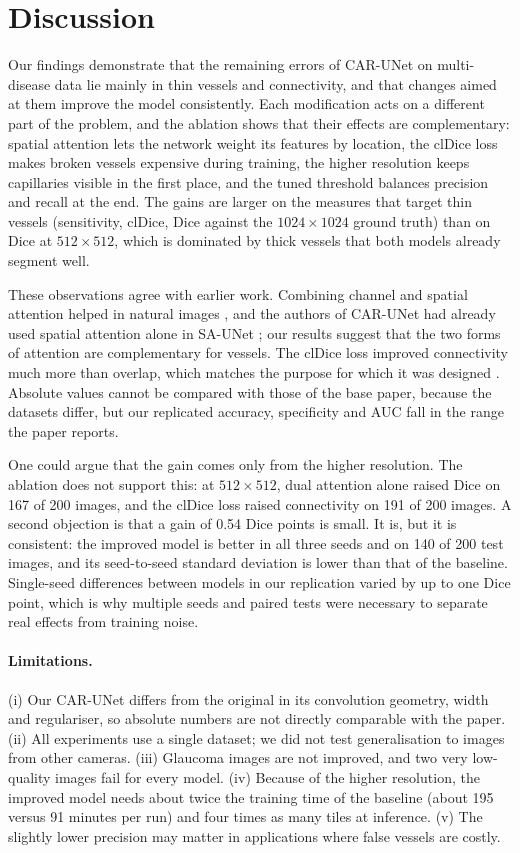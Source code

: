 \documentclass[a4paper,fleqn]{cas-sc}
\begin{document}
\section{Discussion}
\label{sec:discussion}

Our findings demonstrate that the remaining errors of CAR-UNet on multi-disease data lie mainly in thin vessels and connectivity, and that changes aimed at them improve the model consistently. Each modification acts on a different part of the problem, and the ablation shows that their effects are complementary: spatial attention lets the network weight its features by location, the clDice loss makes broken vessels expensive during training, the higher resolution keeps capillaries visible in the first place, and the tuned threshold balances precision and recall at the end. The gains are larger on the measures that target thin vessels (sensitivity, clDice, Dice against the $1024\times1024$ ground truth) than on Dice at $512\times512$, which is dominated by thick vessels that both models already segment well.

These observations agree with earlier work. Combining channel and spatial attention helped in natural images \citep{woo2018cbam}, and the authors of CAR-UNet had already used spatial attention alone in SA-UNet \citep{guo2021saunet}; our results suggest that the two forms of attention are complementary for vessels. The clDice loss improved connectivity much more than overlap, which matches the purpose for which it was designed \citep{shit2021cldice}. Absolute values cannot be compared with those of the base paper, because the datasets differ, but our replicated accuracy, specificity and AUC fall in the range the paper reports.

One could argue that the gain comes only from the higher resolution. The ablation does not support this: at $512\times512$, dual attention alone raised Dice on 167 of 200 images, and the clDice loss raised connectivity on 191 of 200 images. A second objection is that a gain of 0.54 Dice points is small. It is, but it is consistent: the improved model is better in all three seeds and on 140 of 200 test images, and its seed-to-seed standard deviation is lower than that of the baseline. Single-seed differences between models in our replication varied by up to one Dice point, which is why multiple seeds and paired tests were necessary to separate real effects from training noise.

\paragraph{Limitations.} (i) Our CAR-UNet differs from the original in its convolution geometry, width and regulariser, so absolute numbers are not directly comparable with the paper. (ii) All experiments use a single dataset; we did not test generalisation to images from other cameras. (iii) Glaucoma images are not improved, and two very low-quality images fail for every model. (iv) Because of the higher resolution, the improved model needs about twice the training time of the baseline (about 195 versus 91 minutes per run) and four times as many tiles at inference. (v) The slightly lower precision may matter in applications where false vessels are costly.
\end{document}
